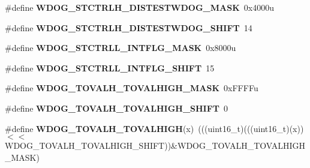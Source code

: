 \begin{DoxyCompactItemize}
\item 
\#define {\bfseries W\+D\+O\+G\+\_\+\+S\+T\+C\+T\+R\+L\+H\+\_\+\+D\+I\+S\+T\+E\+S\+T\+W\+D\+O\+G\+\_\+\+M\+A\+SK}~0x4000u\hypertarget{group__WDOG__Register__Masks_gadc235bcbd7644d445d3ca5cb682cdc57}{}\label{group__WDOG__Register__Masks_gadc235bcbd7644d445d3ca5cb682cdc57}

\item 
\#define {\bfseries W\+D\+O\+G\+\_\+\+S\+T\+C\+T\+R\+L\+H\+\_\+\+D\+I\+S\+T\+E\+S\+T\+W\+D\+O\+G\+\_\+\+S\+H\+I\+FT}~14\hypertarget{group__WDOG__Register__Masks_gabc176648bbc119e959823d20c38d3ece}{}\label{group__WDOG__Register__Masks_gabc176648bbc119e959823d20c38d3ece}

\item 
\#define {\bfseries W\+D\+O\+G\+\_\+\+S\+T\+C\+T\+R\+L\+L\+\_\+\+I\+N\+T\+F\+L\+G\+\_\+\+M\+A\+SK}~0x8000u\hypertarget{group__WDOG__Register__Masks_ga28985249246b9ad12b7f4e50d5d1ee46}{}\label{group__WDOG__Register__Masks_ga28985249246b9ad12b7f4e50d5d1ee46}

\item 
\#define {\bfseries W\+D\+O\+G\+\_\+\+S\+T\+C\+T\+R\+L\+L\+\_\+\+I\+N\+T\+F\+L\+G\+\_\+\+S\+H\+I\+FT}~15\hypertarget{group__WDOG__Register__Masks_ga672e303cca0aaea64e48b5e632a2e666}{}\label{group__WDOG__Register__Masks_ga672e303cca0aaea64e48b5e632a2e666}

\item 
\#define {\bfseries W\+D\+O\+G\+\_\+\+T\+O\+V\+A\+L\+H\+\_\+\+T\+O\+V\+A\+L\+H\+I\+G\+H\+\_\+\+M\+A\+SK}~0x\+F\+F\+F\+Fu\hypertarget{group__WDOG__Register__Masks_ga3b934300a204f2b11fefc7961dc25f55}{}\label{group__WDOG__Register__Masks_ga3b934300a204f2b11fefc7961dc25f55}

\item 
\#define {\bfseries W\+D\+O\+G\+\_\+\+T\+O\+V\+A\+L\+H\+\_\+\+T\+O\+V\+A\+L\+H\+I\+G\+H\+\_\+\+S\+H\+I\+FT}~0\hypertarget{group__WDOG__Register__Masks_ga6729532c2b047c0d3327ffcf7357825c}{}\label{group__WDOG__Register__Masks_ga6729532c2b047c0d3327ffcf7357825c}

\item 
\#define {\bfseries W\+D\+O\+G\+\_\+\+T\+O\+V\+A\+L\+H\+\_\+\+T\+O\+V\+A\+L\+H\+I\+GH}(x)~(((uint16\+\_\+t)(((uint16\+\_\+t)(x))$<$$<$W\+D\+O\+G\+\_\+\+T\+O\+V\+A\+L\+H\+\_\+\+T\+O\+V\+A\+L\+H\+I\+G\+H\+\_\+\+S\+H\+I\+FT))\&W\+D\+O\+G\+\_\+\+T\+O\+V\+A\+L\+H\+\_\+\+T\+O\+V\+A\+L\+H\+I\+G\+H\+\_\+\+M\+A\+SK)\hypertarget{group__WDOG__Register__Masks_ga10c7007564832595b6bd8de07770a9fa}{}\label{group__WDOG__Register__Masks_ga10c7007564832595b6bd8de07770a9fa}


\end{DoxyCompactItemize}
